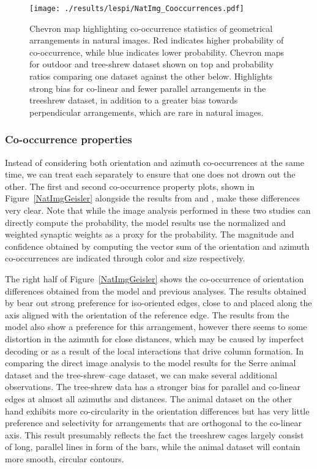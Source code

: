 \begin{figure}
	\centering
        \texttt{[image: ./results/lespi/NatImg\_Cooccurrences.pdf]}
	\caption[Chevron map highlighting co-occurrence statistics of
      geometrical arrangements in natural images.]{Chevron map
      highlighting co-occurrence statistics of geometrical
      arrangements in natural images. Red indicates higher probability
      of co-occurrence, while blue indicates lower
      probability. Chevron maps for outdoor and tree-shrew dataset
      shown on top and probability ratios comparing one dataset
      against the other below. Highlights strong bias for co-linear
      and fewer parallel arrangements in the treeshrew dataset, in
      addition to a greater bias towards perpendicular arrangements,
      which are rare in natural images. }
	\label{NatImgCooccurrences}
\end{figure}

\subsubsection*{Co-occurrence properties}

Instead of considering both orientation and azimuth co-occurrences at
the same time, we can treat each separately to ensure that one does
not drown out the other. The first and second co-occurrence property
plots, shown in Figure~\ref{NatImgGeisler} alongside the results from
\cite{Geisler2001} and \cite{Perrinet2015}, make these differences
very clear. Note that while the image analysis performed in these two
studies can directly compute the probability, the model results use
the normalized and weighted synaptic weights as a proxy for the
probability. The magnitude and confidence obtained by computing the
vector sum of the orientation and azimuth co-occurrences are indicated
through color and size respectively.

The right half of Figure~\ref{NatImgGeisler} shows the co-occurrence
of orientation differences obtained from the model and previous
analyses. The results obtained by \cite{Geisler2001} bear out strong
preference for iso-oriented edges, close to and placed along the axis
aligned with the orientation of the reference edge. The results from
the model also show a preference for this arrangement, however there
seems to some distortion in the azimuth for close distances, which may
be caused by imperfect decoding or as a result of the local
interactions that drive column formation. In comparing the direct
image analysis to the model results for the Serre animal dataset and
the tree-shrew--cage dataset, we can make several additional
observations. The tree-shrew data has a stronger bias for parallel and
co-linear edges at almost all azimuths and distances. The animal
dataset on the other hand exhibits more co-circularity in the
orientation differences but has very little preference and selectivity
for arrangements that are orthogonal to the co-linear axis. This
result presumably reflects the fact the treeshrew cages largely
consist of long, parallel lines in form of the bars, while the animal
dataset will contain more smooth, circular contours.

